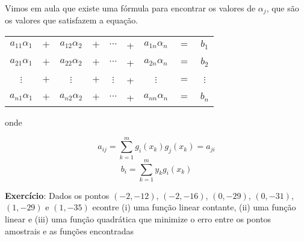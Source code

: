 \documentclass[12pt]{article}
\begin{document}
Vimos em aula que existe uma fórmula para encontrar os valores de $\alpha_j$, que são os valores que satisfazem a equação.

\begin{tabular}{ccccccccc}
   $a_{11}\alpha_1$ & $+$ & $a_{12}\alpha_2$ & $+$ & $\cdots$ & + & $a_{1n}\alpha_n$ & $=$ & $b_1$ \\
   $a_{21}\alpha_1$ & $+$ & $a_{22}\alpha_2$ & $+$ & $\cdots$ & + & $a_{2n}\alpha_n$ & $=$ & $b_2$ \\
   $\vdots$         & $+$ & $\vdots$         & $+$ & $\vdots$ & + &         $\vdots$ & $=$ &$\vdots$ \\
   $a_{n1}\alpha_1$ & $+$ & $a_{n2}\alpha_2$ & $+$ & $\cdots$ & + & $a_{nn}\alpha_n$ & $=$ & $b_n$ 
\end{tabular}

onde 


\[a_{ij} = \sum_{k=1}^{m}g_i(x_k)g_j(x_k) = a_{ji}\]
\[b_i = \sum_{k=1}^{m}y_kg_i(x_k)\]


\textbf{Exercício}: Dados os pontos $(-2, -12)$, $(-2, -16)$, $(0, -29)$, $(0, -31)$, $(1, -29)$ e $(1, -35)$ econtre (i) uma função linear contante, (ii) uma função linear e (iii) uma função quadrática que minimize o erro entre os pontos  amostrais e as funções encontradas
\end{document}
